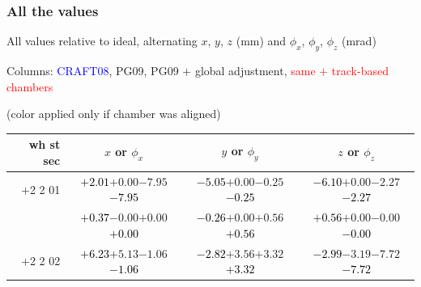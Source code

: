 \documentclass[compress]{beamer}
\begin{document}
\begin{frame}
\frametitle{All the values}
\tiny

All values relative to ideal, alternating $x$, $y$, $z$ (mm) and $\phi_x$, $\phi_y$, $\phi_z$ (mrad)

Columns: \textcolor{blue}{CRAFT08}, PG09, PG09 $+$ global adjustment, \textcolor{red}{same $+$ track-based chambers}

\hfill (color applied only if chamber was aligned)

\vfill
\renewcommand{\arraystretch}{1.1}
\begin{tabular}{r | c | c | c}
wh st sec & $x$ or $\phi_x$ & $y$ or $\phi_y$ & $z$ or $\phi_z$ \\\hline
$+$2 2 01 & \textcolor{black}{$+2.01$}\hspace{0.1 cm}$+0.00$\hspace{0.1 cm}$-7.95$\hspace{0.1 cm}\textcolor{black}{$-7.95$} & \textcolor{black}{$-5.05$}\hspace{0.1 cm}$+0.00$\hspace{0.1 cm}$-0.25$\hspace{0.1 cm}\textcolor{black}{$-0.25$} & \textcolor{black}{$-6.10$}\hspace{0.1 cm}$+0.00$\hspace{0.1 cm}$-2.27$\hspace{0.1 cm}\textcolor{black}{$-2.27$} \\
          & \textcolor{black}{$+0.37$}\hspace{0.1 cm}$-0.00$\hspace{0.1 cm}$+0.00$\hspace{0.1 cm}\textcolor{black}{$+0.00$} & \textcolor{black}{$-0.26$}\hspace{0.1 cm}$+0.00$\hspace{0.1 cm}$+0.56$\hspace{0.1 cm}\textcolor{black}{$+0.56$} & \textcolor{black}{$+0.56$}\hspace{0.1 cm}$+0.00$\hspace{0.1 cm}$-0.00$\hspace{0.1 cm}\textcolor{black}{$-0.00$} \\
$+$2 2 02 & \textcolor{black}{$+6.23$}\hspace{0.1 cm}$+5.13$\hspace{0.1 cm}$-1.06$\hspace{0.1 cm}\textcolor{black}{$-1.06$} & \textcolor{black}{$-2.82$}\hspace{0.1 cm}$+3.56$\hspace{0.1 cm}$+3.32$\hspace{0.1 cm}\textcolor{black}{$+3.32$} & \textcolor{black}{$-2.99$}\hspace{0.1 cm}$-3.19$\hspace{0.1 cm}$-7.72$\hspace{0.1 cm}\textcolor{black}{$-7.72$} \\

\end{tabular}
\end{frame}
\end{document}
